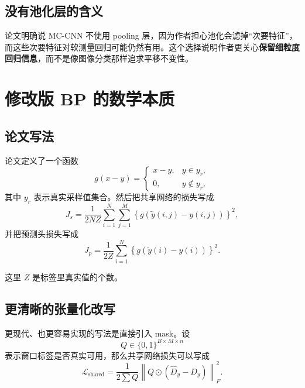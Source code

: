 \documentclass[UTF8]{ctexart}
\begin{document}
\subsection{没有池化层的含义}

论文明确说 MC-CNN 不使用 pooling 层，因为作者担心池化会滤掉“次要特征”，而这些次要特征对软测量回归可能仍然有用。这个选择说明作者更关心\textbf{保留细粒度回归信息}，而不是像图像分类那样追求平移不变性。

\section{修改版 BP 的数学本质}

\subsection{论文写法}

论文定义了一个函数
\begin{equation}
    g(x-y)=
    \begin{cases}
        x-y, & y \in y_r, \\
        0, & y \notin y_r,
    \end{cases}
\end{equation}
其中 $y_r$ 表示真实采样值集合。然后把共享网络的损失写成
\begin{equation}
    J_s = \frac{1}{2 N Z} \sum_{i=1}^{N}\sum_{j=1}^{M}
    \left\{
        g\!\left(\tilde{y}(i,j)-y(i,j)\right)
    \right\}^2,
\end{equation}
并把预测头损失写成
\begin{equation}
    J_p = \frac{1}{2 Z} \sum_{i=1}^{N}
    \left\{
        g\!\left(\tilde{y}(i)-y(i)\right)
    \right\}^2.
\end{equation}

这里 $Z$ 是标签里真实值的个数。

\subsection{更清晰的张量化改写}

更现代、也更容易实现的写法是直接引入 mask。设
\begin{equation}
    Q \in \{0,1\}^{B \times M \times n}
\end{equation}
表示窗口标签是否真实可用，那么共享网络损失可以写成
\begin{equation}
    \mathcal{L}_{\text{shared}}
    =
    \frac{1}{2 \sum Q}
    \left\|
        Q \odot (\hat{D}_y - D_y)
    \right\|_F^2.
\end{equation}
\end{document}
